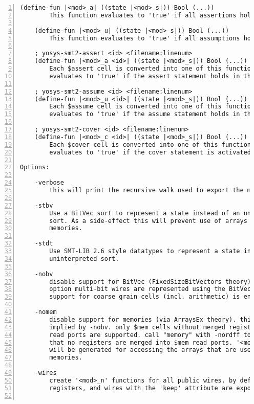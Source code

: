 \begin{lstlisting}[numbers=left,frame=single]
    (define-fun |<mod>_a| ((state |<mod>_s|)) Bool (...))
        This function evaluates to 'true' if all assertions hold in the state.

    (define-fun |<mod>_u| ((state |<mod>_s|)) Bool (...))
        This function evaluates to 'true' if all assumptions hold in the state.

    ; yosys-smt2-assert <id> <filename:linenum>
    (define-fun |<mod>_a <id>| ((state |<mod>_s|)) Bool (...))
        Each $assert cell is converted into one of this functions. The function
        evaluates to 'true' if the assert statement holds in the state.

    ; yosys-smt2-assume <id> <filename:linenum>
    (define-fun |<mod>_u <id>| ((state |<mod>_s|)) Bool (...))
        Each $assume cell is converted into one of this functions. The function
        evaluates to 'true' if the assume statement holds in the state.

    ; yosys-smt2-cover <id> <filename:linenum>
    (define-fun |<mod>_c <id>| ((state |<mod>_s|)) Bool (...))
        Each $cover cell is converted into one of this functions. The function
        evaluates to 'true' if the cover statement is activated in the state.

Options:

    -verbose
        this will print the recursive walk used to export the modules.

    -stbv
        Use a BitVec sort to represent a state instead of an uninterpreted
        sort. As a side-effect this will prevent use of arrays to model
        memories.

    -stdt
        Use SMT-LIB 2.6 style datatypes to represent a state instead of an
        uninterpreted sort.

    -nobv
        disable support for BitVec (FixedSizeBitVectors theory). without this
        option multi-bit wires are represented using the BitVec sort and
        support for coarse grain cells (incl. arithmetic) is enabled.

    -nomem
        disable support for memories (via ArraysEx theory). this option is
        implied by -nobv. only $mem cells without merged registers in
        read ports are supported. call "memory" with -nordff to make sure
        that no registers are merged into $mem read ports. '<mod>_m' functions
        will be generated for accessing the arrays that are used to represent
        memories.

    -wires
        create '<mod>_n' functions for all public wires. by default only ports,
        registers, and wires with the 'keep' attribute are exported.


\end{lstlisting}
